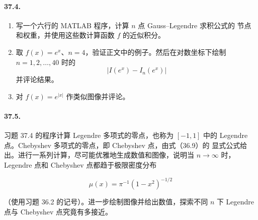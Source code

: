 \documentclass[UTF8,fontset=none,12pt]{ctexart}
\begin{document}
\paragraph{37.4.}
\begin{enumerate}[label=(\alph*)]
\item 写一个六行的 MATLAB 程序，计算 $n$ 点 Gauss--Legendre 求积公式的
节点和权重，并使用这些数计算函数 $f$ 的近似积分。
\item 取 $f(x)=e^x$、$n=4$，验证正文中的例子。然后在对数坐标下绘制
$n=1,2,\ldots,40$ 时的
\[
\lvert I(e^x)-I_n(e^x)\rvert
\]
并评论结果。
\item 对 $f(x)=e^{|x|}$ 作类似图像并评论。
\end{enumerate}

\paragraph{37.5.}
习题 37.4 的程序计算 Legendre 多项式的零点，也称为 $[-1,1]$ 中的
Legendre 点。Chebyshev 多项式的零点，即 Chebyshev 点，由式（36.9）的
显式公式给出。进行一系列计算，尽可能优雅地生成数值和图像，说明当
$n\to\infty$ 时，Legendre 点和 Chebyshev 点都趋于极限密度分布

\[
\mu(x)=\pi^{-1}(1-x^2)^{-1/2}
\]

（使用习题 36.2 的记号）。进一步绘制图像并给出数值，探索不同 $n$ 下
Legendre 点与 Chebyshev 点究竟有多接近。
\end{document}
